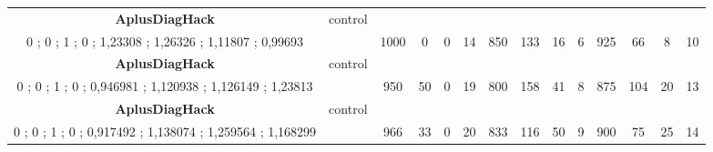 \begin{table}[]
{\begin{tabular}{|c|c|c|c|c|c|c|c|c|c|c|c|c|c|}
\cellcolor{blue!15}\textbf{AplusDiagHack} & control& {\color[HTML]{00009B} } & {\color[HTML]{9A0000} } & {\color[HTML]{009901} } &  & {\color[HTML]{00009B} } & {\color[HTML]{9A0000} } & {\color[HTML]{009901} } &  & {\color[HTML]{00009B} } & {\color[HTML]{9A0000} } & {\color[HTML]{009901} } &  \\ 
\cellcolor{ blue!15}0 ; 0 ; 1 ; 0 ; 1,23308 ; 1,26326 ; 1,11807 ; 0,99693 &  & \multirow{-2}{*}{{\color[HTML]{00009B} 1000}} & \multirow{-2}{*}{{\color[HTML]{9A0000} 0}} & \multirow{-2}{*}{{\color[HTML]{009901} 0}} & \multirow{-2}{*}{14} & \multirow{-2}{*}{{\color[HTML]{00009B} 850}} & \multirow{-2}{*}{{\color[HTML]{9A0000} 133}} & \multirow{-2}{*}{{\color[HTML]{009901} 16}} & \multirow{-2}{*}{6} & \multirow{-2}{*}{{\color[HTML]{00009B} 925}} & \multirow{-2}{*}{{\color[HTML]{9A0000} 66}} & \multirow{-2}{*}{{\color[HTML]{009901} 8}} & \multirow{-2}{*}{10} \\ \hline

\cellcolor{blue!15}\textbf{AplusDiagHack} & control& {\color[HTML]{00009B} } & {\color[HTML]{9A0000} } & {\color[HTML]{009901} } &  & {\color[HTML]{00009B} } & {\color[HTML]{9A0000} } & {\color[HTML]{009901} } &  & {\color[HTML]{00009B} } & {\color[HTML]{9A0000} } & {\color[HTML]{009901} } &  \\ 
\cellcolor{ blue!15}0 ; 0 ; 1 ; 0 ; 0,946981 ; 1,120938 ; 1,126149 ; 1,23813 &  & \multirow{-2}{*}{{\color[HTML]{00009B} 950}} & \multirow{-2}{*}{{\color[HTML]{9A0000} 50}} & \multirow{-2}{*}{{\color[HTML]{009901} 0}} & \multirow{-2}{*}{19} & \multirow{-2}{*}{{\color[HTML]{00009B} 800}} & \multirow{-2}{*}{{\color[HTML]{9A0000} 158}} & \multirow{-2}{*}{{\color[HTML]{009901} 41}} & \multirow{-2}{*}{8} & \multirow{-2}{*}{{\color[HTML]{00009B} 875}} & \multirow{-2}{*}{{\color[HTML]{9A0000} 104}} & \multirow{-2}{*}{{\color[HTML]{009901} 20}} & \multirow{-2}{*}{13} \\ \hline

\cellcolor{blue!15}\textbf{AplusDiagHack} & control& {\color[HTML]{00009B} } & {\color[HTML]{9A0000} } & {\color[HTML]{009901} } &  & {\color[HTML]{00009B} } & {\color[HTML]{9A0000} } & {\color[HTML]{009901} } &  & {\color[HTML]{00009B} } & {\color[HTML]{9A0000} } & {\color[HTML]{009901} } &  \\ 
\cellcolor{ blue!15}0 ; 0 ; 1 ; 0 ; 0,917492 ; 1,138074 ; 1,259564 ; 1,168299 &  & \multirow{-2}{*}{{\color[HTML]{00009B} 966}} & \multirow{-2}{*}{{\color[HTML]{9A0000} 33}} & \multirow{-2}{*}{{\color[HTML]{009901} 0}} & \multirow{-2}{*}{20} & \multirow{-2}{*}{{\color[HTML]{00009B} 833}} & \multirow{-2}{*}{{\color[HTML]{9A0000} 116}} & \multirow{-2}{*}{{\color[HTML]{009901} 50}} & \multirow{-2}{*}{9} & \multirow{-2}{*}{{\color[HTML]{00009B} 900}} & \multirow{-2}{*}{{\color[HTML]{9A0000} 75}} & \multirow{-2}{*}{{\color[HTML]{009901} 25}} & \multirow{-2}{*}{14} \\ \hline


\end{tabular}}
\end{table}
